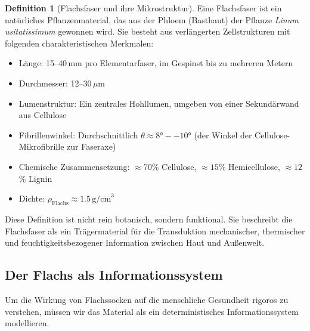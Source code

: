 \documentclass[a4paper,12pt]{article}
\theoremstyle{definition}
\newtheorem{definition}{Definition}
\begin{document}
\begin{definition}[Flachsfaser und ihre Mikrostruktur]
Eine Flachsfaser ist ein natürliches Pflanzenmaterial, das aus der Phloem (Basthaut) der Pflanze \textit{Linum usitatissimum} gewonnen wird. Sie besteht aus verlängerten Zellstrukturen mit folgenden charakteristischen Merkmalen:
\begin{itemize}
    \item[-] Länge: 15--40\,mm pro Elementarfaser, im Gespinst bis zu mehreren Metern
    \item[-] Durchmesser: 12--30\,$\mu$m
    \item[-] Lumenstruktur: Ein zentrales Hohllumen, umgeben von einer Sekundärwand aus Cellulose
    \item[-] Fibrillenwinkel: Durchschnittlich $\theta \approx 8°--10°$ (der Winkel der Cellulose-Mikrofibrille zur Faseraxe)
    \item[-] Chemische Zusammensetzung: $\approx 70$\% Cellulose, $\approx 15$\% Hemicellulose, $\approx 12$\% Lignin
    \item[-] Dichte: $\rho_{\text{Flachs}} \approx 1.5\,\text{g/cm}^3$
\end{itemize}
\end{definition}

Diese Definition ist nicht rein botanisch, sondern funktional. Sie beschreibt die Flachsfaser als ein Trägermaterial für die Transduktion mechanischer, thermischer und feuchtigkeitsbezogener Information zwischen Haut und Außenwelt.

\subsection{Der Flachs als Informationssystem}

Um die Wirkung von Flachssocken auf die menschliche Gesundheit rigoros zu verstehen, müssen wir das Material als ein deterministisches Informationssystem modellieren.
\end{document}
